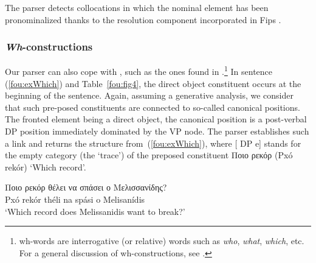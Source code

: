 \documentclass[output=paper]{langsci/langscibook}
\begin{document}
The parser detects collocations in which the nominal element has been pron\-ominalized thanks to the  resolution component incorporated in Fips \citep{wn13}. 


\subsubsection{\textit{Wh}-constructions}
Our parser can also cope with , such as the ones found in .\footnote{wh-words are interrogative (or relative) words such as \textit{who}, \textit{what}, \textit{which}, etc. For a general discussion of wh-constructions, see \citep{chomsky77}.} In sentence (\ref{fou:exWhich}) %
and Table~\ref{fou:fig4}, the direct object constituent occurs at the beginning of the sentence. Again, assuming a generative  analysis, we consider that such pre-posed constituents are connected to so-called canonical positions. The fronted element being a direct object, the canonical position is a post-verbal DP position immediately dominated by the VP node. The parser establishes such a link and returns the structure from~(\ref{fou:exWhich}), where [ DP e] stands for the empty category (the `trace') of the preposed constituent {Ποιο ρεκόρ} (Pxó rekór) `Which record'. 

\ea\label{fou:exWhich}
\gll Ποιο ρεκόρ θέλει να σπάσει ο Μελισσανίδης? \\
Pxó rekór théli na spási o Melisanídis\\
{\small {}       }
\glt `Which record does Melissanidis want to break?'
\z

\end{document}

